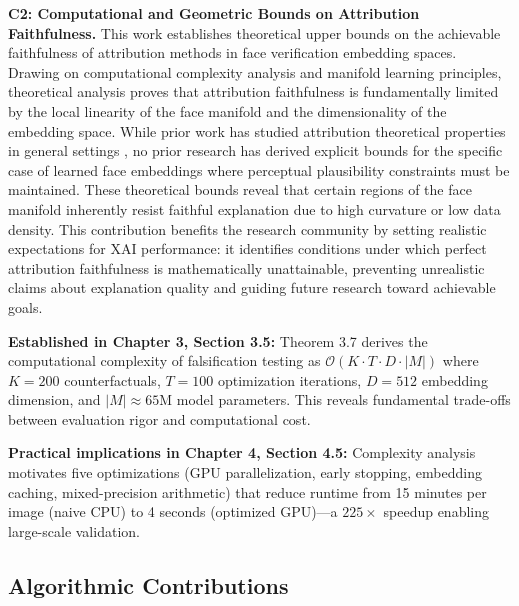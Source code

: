 \textbf{C2: Computational and Geometric Bounds on Attribution Faithfulness.} This work establishes theoretical upper bounds on the achievable faithfulness of attribution methods in face verification embedding spaces. Drawing on computational complexity analysis and manifold learning principles, theoretical analysis proves that attribution faithfulness is fundamentally limited by the local linearity of the face manifold and the dimensionality of the embedding space. While prior work has studied attribution theoretical properties in general settings \cite{Sundararajan2017_IG}, no prior research has derived explicit bounds for the specific case of learned face embeddings where perceptual plausibility constraints must be maintained. These theoretical bounds reveal that certain regions of the face manifold inherently resist faithful explanation due to high curvature or low data density. This contribution benefits the research community by setting realistic expectations for XAI performance: it identifies conditions under which perfect attribution faithfulness is mathematically unattainable, preventing unrealistic claims about explanation quality and guiding future research toward achievable goals.

\vspace{0.3cm}
\noindent\textbf{Established in Chapter 3, Section 3.5:} Theorem 3.7 derives the computational complexity of falsification testing as $\mathcal{O}(K \cdot T \cdot D \cdot |M|)$ where $K=200$ counterfactuals, $T=100$ optimization iterations, $D=512$ embedding dimension, and $|M|\approx 65$M model parameters. This reveals fundamental trade-offs between evaluation rigor and computational cost.

\vspace{0.3cm}
\noindent\textbf{Practical implications in Chapter 4, Section 4.5:} Complexity analysis motivates five optimizations (GPU parallelization, early stopping, embedding caching, mixed-precision arithmetic) that reduce runtime from 15 minutes per image (naive CPU) to 4 seconds (optimized GPU)---a $225\times$ speedup enabling large-scale validation.

\subsection{Algorithmic Contributions}

